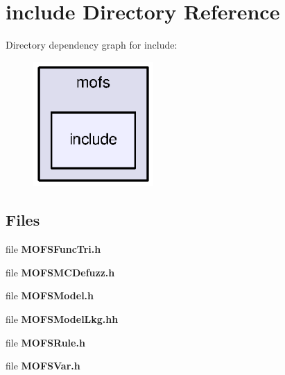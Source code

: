 \section{include Directory Reference}
\label{dir_b3e6c8e3fadbbfb0fd5b83597778a65e}
Directory dependency graph for include\-:
\nopagebreak
\begin{figure}[H]
\begin{center}
\leavevmode
\includegraphics[width=130pt]{dir_b3e6c8e3fadbbfb0fd5b83597778a65e_dep}
\end{center}
\end{figure}
\subsection*{Files}
\begin{DoxyCompactItemize}
\item 
file {\bf M\-O\-F\-S\-Func\-Tri.\-h}
\item 
file {\bf M\-O\-F\-S\-M\-C\-Defuzz.\-h}
\item 
file {\bf M\-O\-F\-S\-Model.\-h}
\item 
file {\bf M\-O\-F\-S\-Model\-Lkg.\-hh}
\item 
file {\bf M\-O\-F\-S\-Rule.\-h}
\item 
file {\bf M\-O\-F\-S\-Var.\-h}
\end{DoxyCompactItemize}
